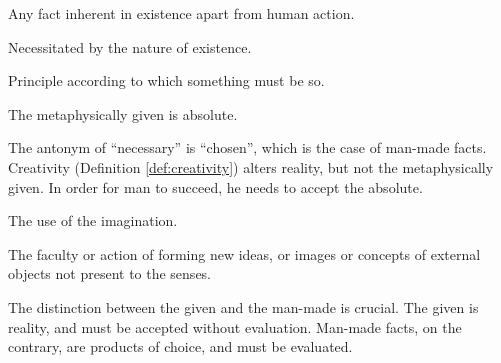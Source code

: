             \begin{definition}
                Any fact inherent in existence apart from human action.
            \end{definition}
            
            \begin{definition}[Absolute]
                Necessitated by the nature of existence.
            \end{definition}

            \begin{definition}[Necessity]
                Principle according to which something must be so.
            \end{definition}
            
            \begin{corollary}
            \label{cor:given}
                The metaphysically given is absolute.
            \end{corollary}
            
        The antonym of ``necessary'' is ``chosen'', which is the case of man-made facts. Creativity (Definition \ref{def:creativity}) alters reality, but not the metaphysically given. In order for man to succeed, he needs to accept the absolute.

            \begin{definition}[Creativity]
            \label{def:creativity}
                The use of the imagination.
            \end{definition}

            \begin{definition}[Imagination]
                The faculty or action of forming new ideas, or images or concepts of external objects not present to the senses.
            \end{definition}
            
        The distinction between the given and the man-made is crucial. The given is reality, and must be accepted without evaluation. Man-made facts, on the contrary, are products of choice, and must be evaluated.
